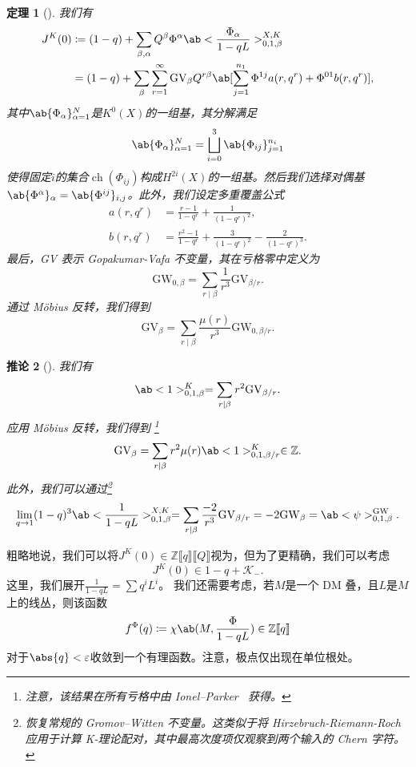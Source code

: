 \documentclass{amsart}
\newtheorem{thm}{定理}[section]
\newtheorem{cor}[thm]{推论}
\theoremstyle{definition}
\theoremstyle{remark}
\theoremstyle{plain}
\theoremstyle{definition}
\theoremstyle{remark}
\newcommand{\Z}{\mathbb{Z}}
\newcommand{\ep}{\varepsilon}
\newcommand{\mc}[1]{\mathcal{#1}}
\newcommand{\mr}[1]{\mathrm{#1}}
\newcommand{\1}{\mathbf{1}}
\newcommand{\2}{\mathbf{2}}
\newcommand{\3}{\mathbf{3}}
\newcommand{\ps}[1]{\llbracket #1 \rrbracket}
\DeclareMathOperator{\ch}{ch}
\begin{document}
\begin{thm}[{\cite{ChouLee2025}}]
    我们有
    \begin{align*}
        J^K(0) &\coloneqq (1-q) + \sum_{\beta, \alpha} Q^{\beta} \Phi^{\alpha} \ab<\frac{\Phi_{\alpha}}{1-qL}>_{0,1,\beta}^{X,K} \\
        &= (1-q) + \sum_{\beta} \sum_{r=1}^{\infty} \mr{GV}_{\beta} Q^{r\beta} \ab[\sum_{j=1}^{n_1} \Phi^{1j} a(r, q^r) + \Phi^{01} b(r, q^r)],
    \end{align*}
    其中\(\ab\{\Phi_{\alpha}\}_{\alpha=1}^N\)是\(K^0(X)\)的一组基，其分解满足
    \[ \ab\{\Phi_{\alpha}\}_{\alpha=1}^N = \bigsqcup_{i=0}^3 \ab\{\Phi_{ij}\}_{j=1}^{n_i} \]
    使得固定\(i\)的集合\(\ch(\Phi_{ij})\)构成\(H^{2i}(X)\)的一组基。然后我们选择对偶基\(\ab\{\Phi^{\alpha}\}_{\alpha} = \ab\{\Phi^{ij}\}_{i,j}\)。此外，我们设定多重覆盖公式
    \begin{align*}
        a(r, q^r) &= \frac{r-1}{1-q^r} + \frac{1}{(1-q^r)^2}, \\
        b(r, q^r) &= \frac{r^2-1}{1-q^r} + \frac{3}{(1-q^r)^2} - \frac{2}{(1-q^r)^3}.
    \end{align*}
    最后，GV 表示 Gopakumar-Vafa 不变量，其在亏格零中定义为
    \[ \mr{GW}_{0,\beta} = \sum_{r \mid \beta} \frac{1}{r^3} \mr{GV}_{\beta/r}. \]
    通过 M\"obius 反转，我们得到
    \[ \mr{GV}_{\beta} = \sum_{r \mid \beta} \frac{\mu(r)}{r^3} \mr{GW}_{0,\beta/r}. \]
\end{thm}

\begin{cor}[{\cite{ChouLee2025}}]
    我们有
    \[ \ab<1>_{0,1,\beta}^K = \sum_{r \mid \beta} r^2 \mr{GV}_{\beta/r}. \]
    应用 M\"obius 反转，我们得到 \footnote{注意，该结果在所有亏格中由 Ionel--Parker~\cite{IonelParker2018} 获得。}
    \[ \mr{GV}_{\beta} = \sum_{r \mid \beta} r^2 \mu(r) \ab<1>_{0,1,\beta/r}^K \in \Z. \]
    此外，我们可以通过\footnote{恢复常规的 Gromov--Witten 不变量。这类似于将 Hirzebruch-Riemann-Roch 应用于计算 K-理论配对，其中最高次度项仅观察到两个输入的 Chern 字符。}
    \[ \lim_{q \to 1} (1-q)^3 \ab<\frac{1}{1-qL}>_{0,1,\beta}^{X,K} = \sum_{r \mid \beta} \frac{-2}{r^3} \mr{GV}_{\beta/r} = -2 \mr{GW}_{\beta} = \ab<\psi>_{0,1,\beta}^{\mr{GW}}. \]
\end{cor}

粗略地说，我们可以将\(J^K(0) \in \Z\ps{q}\ps{Q}\)视为，但为了更精确，我们可以考虑
\[ J^K(0) \in 1-q + \mc{K}_-. \]
    这里，我们展开\(\frac{1}{1-qL} = \sum q^i L^i\)。
    我们还需要考虑，若\(M\)是一个 DM 叠，且\(L\)是\(M\)上的线丛，则该函数
\[ f^{\Phi}(q) \coloneqq \chi\ab(M, \frac{\Phi}{1-qL}) \in \Z \ps{q} \]
对于\(\abs{q} < \ep\)收敛到一个有理函数。注意，极点仅出现在单位根处。
\end{document}
